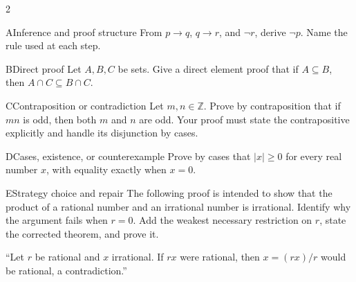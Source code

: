 \documentclass[9pt]{extarticle}
\begin{document}
\begin{multicols}{2}
\begin{CoreProblem}{A}{Inference and proof structure}
From $p\to q$, $q\to r$, and $\neg r$, derive $\neg p$. Name the rule used at
each step.
\end{CoreProblem}
\begin{CoreProblem}{B}{Direct proof}
Let $A,B,C$ be sets. Give a direct element proof that if $A\subseteq B$, then
$A\cap C\subseteq B\cap C$.
\end{CoreProblem}
\begin{CoreProblem}{C}{Contraposition or contradiction}
Let $m,n\in\mathbb Z$. Prove by contraposition that if $mn$ is odd, then both
$m$ and $n$ are odd. Your proof must state the contrapositive explicitly and
handle its disjunction by cases.
\end{CoreProblem}
\columnbreak
\begin{CoreProblem}{D}{Cases, existence, or counterexample}
Prove by cases that $|x|\ge 0$ for every real number $x$, with equality exactly when $x=0$.
\end{CoreProblem}
\begin{CoreProblem}{E}{Strategy choice and repair}
The following proof is intended to show that the product of a rational number
and an irrational number is irrational. Identify why the argument fails when
$r=0$. Add the weakest necessary restriction on $r$, state the corrected
theorem, and prove it.

``Let $r$ be rational and $x$ irrational. If $rx$ were rational, then $x=(rx)/r$ would be rational, a contradiction.''
\end{CoreProblem}
\end{multicols}
\CoreWorkArea
\FormBreak
{}
\end{document}
